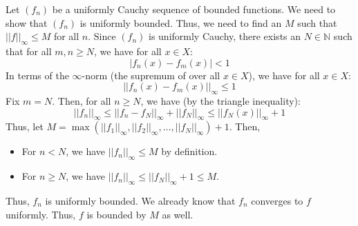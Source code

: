 \documentclass[12pt]{article}
\begin{document}
\begin{solu}
    Let $(f_n)$ be a uniformly Cauchy sequence of bounded functions. We need to show that $(f_n)$ is uniformly bounded. Thus, we need to find an $M$ such that $||f||_\infty \leq M$ for all $n$. \bbni
    Since $(f_n)$ is uniformly Cauchy, there exists an $N \in \mathbb{N}$ such that for all $m, n \geq N$, we have for all $x \in X$:
    \[ |f_n(x) - f_m(x)| < 1 \]
    In terms of the $\infty$-norm (the supremum of over all $x \in X$), we have for all $x \in X$:
    \[ ||f_n(x) - f_m(x)||_\infty \leq 1 \]
    Fix $m = N$. Then, for all $n \geq N$, we have (by the triangle inequality):
    \[ ||f_n||_\infty \leq ||f_n-f_N||_\infty + ||f_N||_\infty \leq ||f_N(x)||_\infty + 1\]
    Thus, let $M = \max(||f_1||_\infty, ||f_2||_\infty, \ldots, ||f_N||_\infty)+1$. Then, 
    \begin{itemize}
        \item For $n < N$, we have $||f_n||_\infty \leq M$ by definition.
        \item For $n \geq N$, we have $||f_n||_\infty \leq ||f_N||_\infty + 1 \leq M$. 
    \end{itemize}
    Thus, $f_n$ is uniformly bounded. We already know that $f_n$ converges to $f$ uniformly. Thus, $f$ is bounded by $M$ as well. 
\end{solu}
\end{document}
